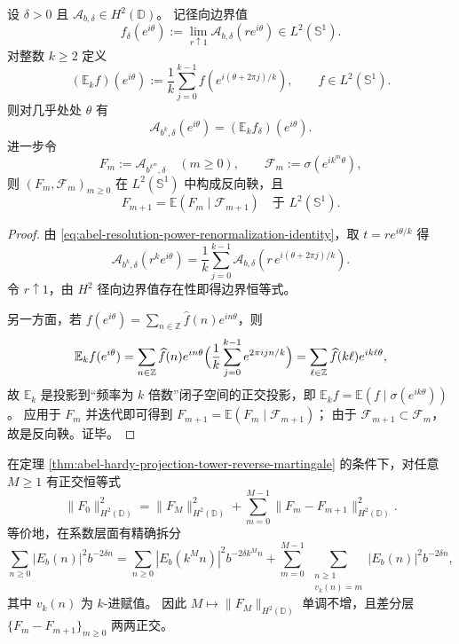 \begin{theorem}\label{thm:abel-hardy-projection-tower-reverse-martingale}
设 \(\delta>0\) 且 \(\mathcal A_{b,\delta}\in H^2(\mathbb D)\)。
记径向边界值
\[
f_\delta(e^{i\theta}):=\lim_{r\uparrow 1}\mathcal A_{b,\delta}(re^{i\theta})\in L^2(\mathbb S^1).
\]
对整数 \(k\ge 2\) 定义
\[
(\mathbb E_k f)(e^{i\theta})
:=\frac1k\sum_{j=0}^{k-1}f\!\left(e^{i(\theta+2\pi j)/k}\right),\qquad f\in L^2(\mathbb S^1).
\]
则对几乎处处 \(\theta\) 有
\[
\mathcal A_{b^k,\delta}(e^{i\theta})=(\mathbb E_k f_\delta)(e^{i\theta}).
\]
进一步令
\[
F_m:=\mathcal A_{b^{k^m},\delta}\quad(m\ge 0),\qquad
\mathcal F_m:=\sigma\!\left(e^{ik^m\theta}\right),
\]
则 \((F_m,\mathcal F_m)_{m\ge 0}\) 在 \(L^2(\mathbb S^1)\) 中构成反向鞅，且
\[
F_{m+1}=\mathbb E(F_m\mid\mathcal F_{m+1})
\quad\text{于 }L^2(\mathbb S^1).
\]
\end{theorem}

\begin{proof}
由 \eqref{eq:abel-resolution-power-renormalization-identity}，取 \(t=re^{i\theta/k}\) 得
\[
\mathcal A_{b^k,\delta}(r^k e^{i\theta})
=\frac1k\sum_{j=0}^{k-1}
\mathcal A_{b,\delta}\!\left(r\,e^{i(\theta+2\pi j)/k}\right).
\]
令 \(r\uparrow 1\)，由 \(H^2\) 径向边界值存在性即得边界恒等式。

另一方面，若 \(f(e^{i\theta})=\sum_{n\in\mathbb Z}\widehat f(n)e^{in\theta}\)，则
\[
\mathbb E_k f(e^{i\theta})
=\sum_{n\in\mathbb Z}\widehat f(n)e^{in\theta}
\Bigl(\frac1k\sum_{j=0}^{k-1}e^{2\pi ijn/k}\Bigr)
=\sum_{\ell\in\mathbb Z}\widehat f(k\ell)e^{ik\ell\theta},
\]
故 \(\mathbb E_k\) 是投影到“频率为 \(k\) 倍数”闭子空间的正交投影，即
\(
\mathbb E_k f=\mathbb E(f\mid \sigma(e^{ik\theta}))
\)。
应用于 \(F_m\) 并迭代即可得到
\(
F_{m+1}=\mathbb E(F_m\mid\mathcal F_{m+1})
\)；
由于 \(\mathcal F_{m+1}\subset\mathcal F_m\)，故是反向鞅。证毕。
\end{proof}

\begin{corollary}\label{cor:abel-kadic-multiresolution-energy-ledger}
在定理 \ref{thm:abel-hardy-projection-tower-reverse-martingale} 的条件下，对任意 \(M\ge 1\) 有正交恒等式
\[
\|F_0\|_{H^2(\mathbb D)}^2
=\|F_M\|_{H^2(\mathbb D)}^2+\sum_{m=0}^{M-1}\|F_m-F_{m+1}\|_{H^2(\mathbb D)}^2.
\]
等价地，在系数层面有精确拆分
\[
\sum_{n\ge 0}|E_b(n)|^2b^{-2\delta n}
=\sum_{n\ge 0}|E_b(k^Mn)|^2b^{-2\delta k^Mn}
+\sum_{m=0}^{M-1}\ \sum_{\substack{n\ge 1\\ v_k(n)=m}}
|E_b(n)|^2b^{-2\delta n},
\]
其中 \(v_k(n)\) 为 \(k\)-进赋值。
因此 \(M\mapsto\|F_M\|_{H^2(\mathbb D)}\) 单调不增，且差分层 \(\{F_m-F_{m+1}\}_{m\ge 0}\) 两两正交。
\end{corollary}

